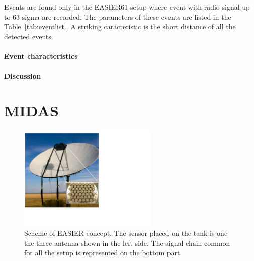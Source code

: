 \documentclass{PoS}
\begin{document}
Events are found only in the EASIER61 setup where event with radio signal up to 63 sigma are recorded. The parameters of these events are listed in the Table~\ref{tab:eventlist}. A striking caracteristic is the short distance of all the detected events. 

\paragraph{Event characteristics}
\paragraph{Discussion}


\section{MIDAS}
\begin{figure}[h]
\centering
\includegraphics[width=0.6\textwidth]{midasdet.pdf}

\caption{Scheme of EASIER concept. The sensor  placed on the tank is one the three antenna shown in the left side. The signal chain common for all the setup is represented on the bottom part.}
\label{fig:baselines}
\end{figure}
\end{document}
